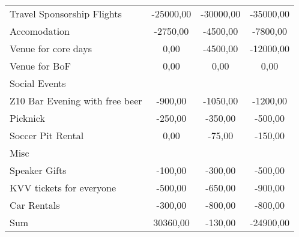 \begin{tabularx}{\linewidth}{XSSS}
\hspace*{1em} Travel Sponsorship Flights & -25000,00 & -30000,00 & -35000,00 \\
\hspace*{1em} \hspace*{1em} Accomodation & -2750,00 & -4500,00 & -7800,00 \\   
\hspace*{1em} Venue for core days  & 0,00 & -4500,00 & -12000,00 \\
\hspace*{1em} Venue for BoF  & 0,00 & 0,00 & 0,00 \\
\hspace*{1em} Social Events  &  &  &  \\
\hspace*{1em} \hspace*{1em} Z10 Bar Evening with free beer & -900,00 & -1050,00 & -1200,00 \\
\hspace*{1em} \hspace*{1em} Picknick & -250,00 & -350,00 & -500,00 \\
\hspace*{1em} \hspace*{1em} Soccer Pit Rental & 0,00 & -75,00 & -150,00 \\
\hspace*{1em} Misc  &  &  &  \\
\hspace*{1em} \hspace*{1em} Speaker Gifts & -100,00 & -300,00 & -500,00 \\
\hspace*{1em} \hspace*{1em} KVV tickets for everyone & -500,00 & -650,00 & -900,00 \\
\hspace*{1em} \hspace*{1em} Car Rentals & -300,00 & -800,00 & -800,00 \\\hline
Sum \hspace*{1em}  & 30360,00 & -130,00 & -24900,00 \\

\end{tabularx}
